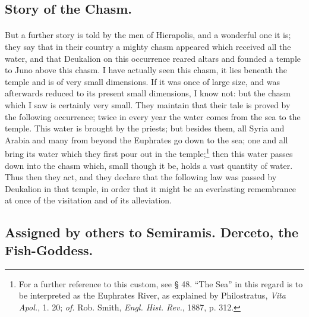 \documentclass[a4paper, 11pt, oneside, polutonikogreek, english]{article}
\begin{document}
\subsection{Story of the Chasm.}
\paragraph{}
But a further story is told by the men of Hierapolis, and a wonderful one it is; they say that in their country a mighty chasm appeared which received all the water, and that Deukalion on this occurrence reared altars and founded a temple to Juno above this chasm. I have actually seen this chasm, it lies beneath the temple and is of very small dimensions. If it was once of large size, and was afterwards reduced to its present small dimensions, I know not: but the chasm which I saw is certainly very small. They maintain that their tale is proved by the following occurrence; twice in every year the water comes from the sea to the temple. This water is brought by the priests; but besides them, all Syria and Arabia and many from beyond the Euphrates go down to the sea; one and all bring its water which they first pour out in the temple;\footnote{For a further reference to this custom, see § 48. ``The Sea'' in this regard is to be interpreted as the Euphrates River, as explained by Philostratus, \emph{Vita Apol.}, 1. 20; \emph{of.} Rob. Smith, \emph{Engl. Hist. Rev.}, 1887, p. 312.} then this water passes down into the chasm which, small though it be, holds a vast quantity of water. Thus then they act, and they declare that the following law was passed by Deukalion in that temple, in order that it might be an everlasting remembrance at once of the visitation and of its alleviation.

\subsection{Assigned by others to Semiramis. Derceto, the Fish-Goddess.}
\end{document}
